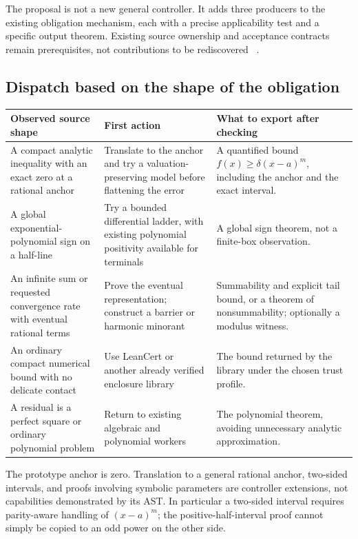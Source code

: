 \documentclass[11pt,a4paper]{article}
\theoremstyle{definition}\newtheorem{definition}[theorem]{Definition}
\begin{document}
The proposal is not a new general controller. It adds three producers to the
existing obligation mechanism, each with a precise applicability test and a
specific output theorem. Existing source ownership and acceptance contracts
remain prerequisites, not contributions to be rediscovered
~\cite{forge-neighbours,djex-graphs}.

\subsection{Dispatch based on the shape of the obligation}

\begin{longtable}{@{}P{.29\textwidth}P{.29\textwidth}P{.36\textwidth}@{}}
\toprule
Observed source shape & First action & What to export after checking \\
\midrule\endhead
A compact analytic inequality with an exact zero at a rational anchor &
Translate to the anchor and try a valuation-preserving model before flattening the error &
A quantified bound $f(x)\ge\delta(x-a)^m$, including the anchor and the exact interval. \\
A global exponential-polynomial sign on a half-line &
Try a bounded differential ladder, with existing polynomial positivity available for terminals &
A global sign theorem, not a finite-box observation. \\
An infinite sum or requested convergence rate with eventual rational terms &
Prove the eventual representation; construct a barrier or harmonic minorant &
Summability and explicit tail bound, or a theorem of nonsummability; optionally a modulus witness. \\
An ordinary compact numerical bound with no delicate contact &
Use LeanCert or another already verified enclosure library &
The bound returned by the library under the chosen trust profile. \\
A residual is a perfect square or ordinary polynomial problem &
Return to existing algebraic and polynomial workers &
The polynomial theorem, avoiding unnecessary analytic approximation. \\
\bottomrule
\end{longtable}

The prototype anchor is zero. Translation to a general rational anchor,
two-sided intervals, and proofs involving symbolic parameters are controller
extensions, not capabilities demonstrated by its AST. In particular a two-sided
interval requires parity-aware handling of $(x-a)^m$; the positive-half-interval
proof cannot simply be copied to an odd power on the other side.
\end{document}
